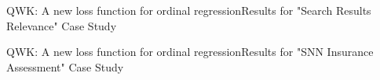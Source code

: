\documentclass{beamer}
\begin{document}
\begin{frame}{QWK: A new loss function for ordinal regression}{Results for "Search Results Relevance" Case Study}	
\begin{figure}[p]
\end{figure}
\end{frame}

\begin{frame}{QWK: A new loss function for ordinal regression}{Results for "SNN Insurance Assessment" Case Study}	
\begin{figure}[p]
\end{figure}
\end{frame}
\end{document}
